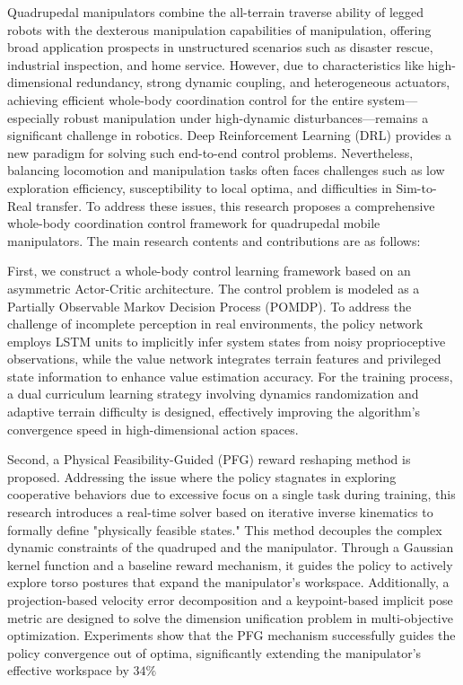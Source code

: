 \cleardoublepage
{}

Quadrupedal manipulators combine the all-terrain traverse ability of legged robots with the dexterous manipulation capabilities of manipulation, offering broad application prospects in unstructured scenarios such as disaster rescue, industrial inspection, and home service. However, due to characteristics like high-dimensional redundancy, strong dynamic coupling, and heterogeneous actuators, achieving efficient whole-body coordination control for the entire system—especially robust manipulation under high-dynamic disturbances—remains a significant challenge in robotics. Deep Reinforcement Learning (DRL) provides a new paradigm for solving such end-to-end control problems. Nevertheless, balancing locomotion and manipulation tasks often faces challenges such as low exploration efficiency, susceptibility to local optima, and difficulties in Sim-to-Real transfer. To address these issues, this research proposes a comprehensive whole-body coordination control framework for quadrupedal mobile manipulators. The main research contents and contributions are as follows:

First, we construct a whole-body control learning framework based on an asymmetric Actor-Critic architecture. The control problem is modeled as a Partially Observable Markov Decision Process (POMDP). To address the challenge of incomplete perception in real environments, the policy network employs LSTM units to implicitly infer system states from noisy proprioceptive observations, while the value network integrates terrain features and privileged state information to enhance value estimation accuracy. For the training process, a dual curriculum learning strategy involving dynamics randomization and adaptive terrain difficulty is designed, effectively improving the algorithm's convergence speed in high-dimensional action spaces.

Second, a Physical Feasibility-Guided (PFG) reward reshaping method is proposed. Addressing the issue where the policy stagnates in exploring cooperative behaviors due to excessive focus on a single task during training, this research introduces a real-time solver based on iterative inverse kinematics to formally define "physically feasible states." This method decouples the complex dynamic constraints of the quadruped and the manipulator. Through a Gaussian kernel function and a baseline reward mechanism, it guides the policy to actively explore torso postures that expand the manipulator's workspace. Additionally, a projection-based velocity error decomposition and a keypoint-based implicit pose metric are designed to solve the dimension unification problem in multi-objective optimization. Experiments show that the PFG mechanism successfully guides the policy convergence out of optima, significantly extending the manipulator's effective workspace by $34\%$

